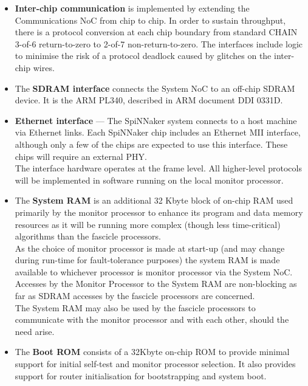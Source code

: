 \documentclass[a4paper, 11pt]{article}
\begin{document}
\begin{itemize}
	\item \textbf{Inter-chip  communication}  is  implemented  by  extending  the Communications NoC  from  chip  to chip.  In  order  to  sustain  throughput,  there  is  a  protocol  conversion  at  each  chip  boundary  from standard CHAIN 3-of-6 return-to-zero to 2-of-7 non-return-to-zero. The interfaces include logic to minimise the risk of a protocol deadlock caused by glitches on the inter-chip wires.
	\item The \textbf{SDRAM  interface}  connects  the System NoC  to  an off-chip SDRAM device.  It  is  the ARM PL340, described in ARM document DDI 0331D.
	\item \textbf{Ethernet interface} --- The  SpiNNaker  system  connects  to  a  host  machine  via  Ethernet  links.  Each  SpiNNaker  chip includes  an  Ethernet MII  interface,  although  only  a  few  of  the  chips  are  expected  to  use  this interface. These chips will require an external PHY.\\
	The interface hardware operates at the frame level. All higher-level protocols will be implemented in software running on the local monitor processor.
	\item The \textbf{System RAM} is an additional 32 Kbyte block of on-chip RAM used primarily by the monitor processor to enhance its program and data memory resources as it will be running more complex (though less time-critical) algorithms than the fascicle processors.\\
	As the choice of monitor processor is made at start-up (and may change during run-time for fault-tolerance  purposes)  the  system  RAM  is  made  available  to  whichever  processor  is  monitor processor via  the System NoC. Accesses by  the Monitor Processor  to  the System RAM are non-blocking as far as SDRAM accesses by the fascicle processors are concerned.\\
	The System RAM may also be used by  the fascicle processors to communicate with  the monitor processor and with each other, should the need arise.
	\item The \textbf{Boot ROM} consists of a 32Kbyte on-chip ROM to provide minimal support for initial self-test and monitor processor selection. It also provides support for router initialisation for bootstrapping and system boot.
\end{itemize}
\end{document}
